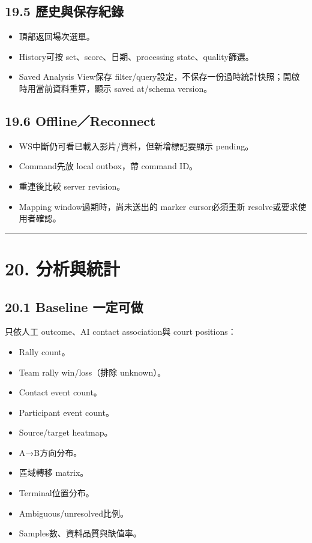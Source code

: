 \documentclass[
  9pt,
  a4paper,
]{article}
\providecommand{\tightlist}{%
  \setlength{\itemsep}{0pt}\setlength{\parskip}{0pt}}
\begin{document}
\subsection{19.5
歷史與保存紀錄}\label{195-ux6b77ux53f2ux8207ux4fddux5b58ux7d00ux9304}

\begin{itemize}
\tightlist
\item
  頂部返回場次選單。
\item
  History可按 set、score、日期、processing state、quality篩選。
\item
  Saved Analysis View保存
  filter/query設定，不保存一份過時統計快照；開啟時用當前資料重算，顯示
  saved at/schema version。
\end{itemize}

\subsection{19.6 Offline／Reconnect}\label{196-offlinereconnect}

\begin{itemize}
\tightlist
\item
  WS中斷仍可看已載入影片/資料，但新增標記要顯示 pending。
\item
  Command先放 local outbox，帶 command ID。
\item
  重連後比較 server revision。
\item
  Mapping window過期時，尚未送出的 marker cursor必須重新
  resolve或要求使用者確認。
\end{itemize}

\begin{center}\rule{0.5\linewidth}{0.5pt}\end{center}

\section{20. 分析與統計}\label{20-ux5206ux6790ux8207ux7d71ux8a08}

\subsection{20.1 Baseline
一定可做}\label{201-baseline-ux4e00ux5b9aux53efux505a}

只依人工 outcome、AI contact association與 court positions：

\begin{itemize}
\tightlist
\item
  Rally count。
\item
  Team rally win/loss（排除 unknown）。
\item
  Contact event count。
\item
  Participant event count。
\item
  Source/target heatmap。
\item
  A→B方向分布。
\item
  區域轉移 matrix。
\item
  Terminal位置分布。
\item
  Ambiguous/unresolved比例。
\item
  Samples數、資料品質與缺值率。
\end{itemize}
\end{document}
